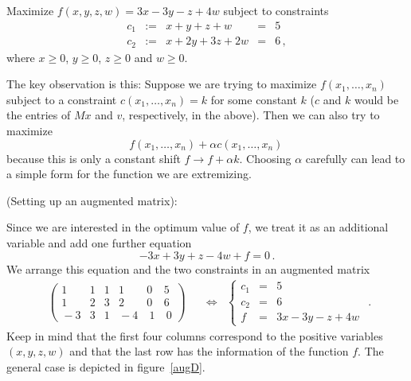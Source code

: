 \begin{example}\label{stdprob}
Maximize $f(x,y,z,w)=3x-3y-z+4w$ subject to constraints
\begin{equation*}
\begin{array}{rcccl}
c_1&:=&x+y+z+w&=&5\\[2mm]
c_2&:=&x+2y+3z+2w&=&6\, ,
\end{array}
\end{equation*}
where $x\geq0$, $y\geq0$, $z\geq0$ and $w\geq 0$.
\end{example}
  The key observation is this: Suppose we are trying to maximize $f(x_1,\ldots,x_n)$ subject to 
  a constraint $c(x_1,\ldots,x_n)=k$ for some constant $k$ ($c$ and $k$ would  be the entries of 
  $Mx$ and $v$, respectively, in the above). Then we can also try to maximize
  \[
 f(x_1,\ldots,x_n)+\alpha c(x_1,\ldots,x_n)\, 
  \]
  because this is only a constant shift $f\to f+\alpha k$. Choosing $\alpha$ carefully can lead to a simple form for the function we are extremizing.



\begin{example} (Setting up an augmented matrix):

Since we are interested in the optimum value of $f$, we treat it as an additional variable and add one further equation
\[
-3x+3y+z-4w+f=0\, .
\]
We arrange this equation and the two constraints in an augmented matrix
\[
\begin{array}{ccc}
\left(\begin{array}{rrrrr|r}
1&1&1&1&0&5\\[1mm]
1&2&3&2&0&6\\\hline
\!-3&3&1&\!\!-4&\ 1&\ 0
\end{array}\right)
\quad &\Leftrightarrow &%
\left\{
\begin{array}{lcl}
c_1&=&5\\[1mm]
c_2&=&6\\[1mm]
f&=&3x-3y-z+4w
\end{array}\right.
\end{array}.
\]
Keep in mind that the first four columns correspond to the positive variables $(x,y,z,w)$ and that
the last row has the information of the function $f$. The general case is depicted in figure~\ref{augD}.
\end{example}

